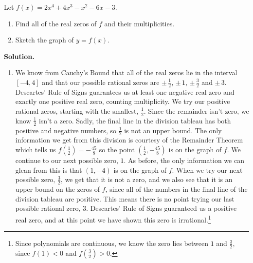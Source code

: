 \documentclass{ximera}
\begin{document}
\begin{example}  Let $f(x) = 2x^4+4x^3-x^2-6x-3$.

\begin{enumerate}

\item  Find all of the real zeros of $f$ and their multiplicities.

\item Sketch the graph of $y=f(x)$.

\end{enumerate}  

{\bf Solution.}  \begin{enumerate}

\item  We know from Cauchy's Bound that all of the real zeros lie in the interval $[-4,4]$ and that our possible rational zeros are $\pm \, \frac{1}{2}$, $\pm \, 1$, $\pm \, \frac{3}{2}$ and $\pm \, 3$.  Descartes' Rule of Signs guarantees us at least one negative real zero and exactly one positive real zero, counting multiplicity.  We try our positive rational zeros, starting with the smallest, $\frac{1}{2}$.  Since the remainder isn't zero, we know $\frac{1}{2}$ isn't a zero.  Sadly, the final line in the division tableau has both positive and negative numbers, so $\frac{1}{2}$ is not an upper bound.  The only information we get from this division is courtesy of the Remainder Theorem which tells us $f\left(\frac{1}{2}\right) =  -\frac{45}{8}$ so the point $\left(\frac{1}{2}, -\frac{45}{8}\right)$ is on the graph of $f$.  We continue to our next possible zero, $1$.  As before, the only information we can glean from this is that $(1,-4)$ is on the graph of $f$.  When we try our next possible zero, $\frac{3}{2}$, we get that it is not a zero, and we also see that it is an upper bound on the zeros of $f$, since all of the numbers in the final line of the division tableau are positive.  This means there is no point trying our last possible rational zero, $3$.  Descartes' Rule of Signs guaranteed us a positive real zero, and at this point we have shown this zero is irrational.\footnote{Since polynomials are continuous, we know the zero lies between $1$ and $\frac{3}{2}$, since $f(1) < 0$ and $f\left(\frac{3}{2}\right) > 0$.}

 
\end{enumerate}
\end{example}
\end{document}
